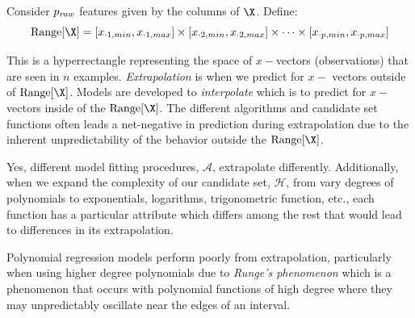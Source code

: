 \documentclass[12pt]{article}
\begin{document}
\begin{enumerate}

\begin{tcolorbox}[colback=white, sharp corners]
Consider $p_{\emph{raw}}$ features given by the columns of $\X$. Define:
\[
	\text{Range}[\X] = [x_{\cdot 1, min}, x_{\cdot 1, max}] \times [x_{\cdot 2, min}, x_{\cdot 2, max}] \times \cdots \times [x_{\cdot p, min}, x_{\cdot p, max}]
\]

This is a hyperrectangle representing the space of $x-$vectors (observations) that are seen in $n$ examples. \emph{Extrapolation} is when we predict for $x-$ vectors outside of $\text{Range}[\X]$. Models are developed to \emph{interpolate} which is to predict for $x-$vectors inside of the $\text{Range}[\X]$. The different algorithms and candidate set functions often leads a net-negative in prediction during extrapolation due to the inherent unpredictability of the behavior outside the $\text{Range}[\X]$.
\end{tcolorbox}


\begin{tcolorbox}[colback=white, sharp corners]
Yes, different model fitting procedures, $ \mathcal{A}$, extrapolate differently. Additionally, when we expand the complexity of our candidate set, $\mathcal{H}$, from vary degrees of polynomials to exponentials, logarithms, trigonometric function, etc., each function has a particular attribute which differs among the rest that would lead to differences in its extrapolation. 
\end{tcolorbox}


\begin{tcolorbox}[colback=white, sharp corners]
Polynomial regression models perform poorly from extrapolation, particularly when using higher degree polynomials due to \emph{Runge's phenomenon} which is a phenomenon that occurs with polynomial functions of high degree where they may unpredictably oscillate near the edges of an interval.
\end{tcolorbox}

\end{enumerate}
\end{document}
